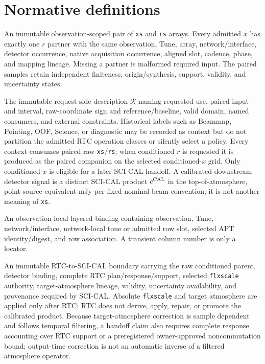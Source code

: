 \section{Normative definitions}
\label{sec:core-definitions}

\begin{description}[style=nextline,leftmargin=1em,labelindent=0pt,
  labelwidth=0pt,labelsep=0pt]

\item[SCI-RTC-DEF-001 -- Admitted aligned paired stream.]
An immutable observation-scoped pair of \texttt{xs} and \texttt{rs} arrays.
Every admitted $x$ has exactly one $r$ partner with the same observation,
Tune, array, network/interface, detector occurrence, native acquisition
occurrence, aligned slot, cadence, phase, and mapping lineage.  Missing a
partner is malformed required input.  The paired samples retain independent
finiteness, origin/synthesis, support, validity, and uncertainty states.

\item[SCI-RTC-DEF-002 -- RTC application context.]
The immutable request-side description $\mathcal R$ naming requested use,
paired input and interval, raw-coordinate sign and reference/baseline, valid
domain, named consumers, and external constraints.  Historical labels such as
Beammap, Pointing, OOF, Science, or diagnostic may be recorded as context but
do not partition the admitted RTC operation classes or silently select a
policy.  Every context consumes paired raw \texttt{xs}/\texttt{rs}; when
conditioned $r$ is requested it is produced as the paired companion on the
selected conditioned-$x$ grid.  Only conditioned $x$ is eligible
for a later SCI-CAL handoff.  A calibrated downstream detector
signal is a distinct SCI-CAL product $c^{\rm CAL}$ in the top-of-atmosphere,
point-source-equivalent mJy-per-fixed-nominal-beam convention; it is not
another meaning of \texttt{xs}.

\item[SCI-RTC-DEF-003 -- Exact detector occurrence.]
An observation-local layered binding containing observation, Tune,
network/interface, network-local tone or admitted row slot, selected APT
identity/digest, and row association.  A transient column number is only a
locator.

\item[SCI-RTC-DEF-004 -- Downstream CAL handoff.]
An immutable RTC-to-SCI-CAL boundary carrying the raw conditioned parent,
detector binding, complete RTC plan/response/support, selected \texttt{flxscale}
authority, target-atmosphere lineage, validity, uncertainty availability, and
provenance required by SCI-CAL.  Absolute \texttt{flxscale} and target
atmosphere are applied only after RTC; RTC does not derive, apply, repair, or
promote the calibrated product.  Because target-atmosphere correction is
sample dependent and follows temporal filtering, a handoff claim also
requires complete response accounting over RTC support or a preregistered
owner-approved noncommutation bound; output-time correction is not an
automatic inverse of a filtered atmosphere operator.


\end{description}
